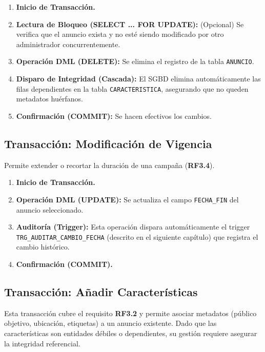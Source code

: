\begin{enumerate}
    \item \textbf{Inicio de Transacción.}
    \item \textbf{Lectura de Bloqueo (SELECT ... FOR UPDATE):} (Opcional) Se verifica que el anuncio exista y no esté siendo modificado por otro administrador concurrentemente.
    \item \textbf{Operación DML (DELETE):} Se elimina el registro de la tabla \texttt{ANUNCIO}.
    \item \textbf{Disparo de Integridad (Cascada):} El SGBD elimina automáticamente las filas dependientes en la tabla \texttt{CARACTERISTICA}, asegurando que no queden metadatos huérfanos.
    \item \textbf{Confirmación (COMMIT):} Se hacen efectivos los cambios.
\end{enumerate}

\subsection{Transacción: Modificación de Vigencia}
Permite extender o recortar la duración de una campaña (\textbf{RF3.4}).

\begin{enumerate}
    \item \textbf{Inicio de Transacción.}
    \item \textbf{Operación DML (UPDATE):} Se actualiza el campo \texttt{FECHA\_FIN} del anuncio seleccionado.
    \item \textbf{Auditoría (Trigger):} Esta operación dispara automáticamente el trigger \texttt{TRG\_AUDITAR\_CAMBIO\_FECHA} (descrito en el siguiente capítulo) que registra el cambio histórico.
    \item \textbf{Confirmación (COMMIT).}
\end{enumerate}

\subsection{Transacción: Añadir Características}
Esta transacción cubre el requisito \textbf{RF3.2} y permite asociar metadatos (público objetivo, ubicación, etiquetas) a un anuncio existente. Dado que las características son entidades débiles o dependientes, su gestión requiere asegurar la integridad referencial.

